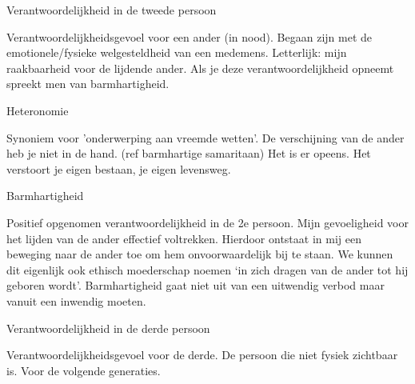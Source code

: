 \documentclass[main.tex]{subfiles}
\begin{document}
\begin{examenvraag}
    \begin{vraag}
        Verantwoordelijkheid in de tweede persoon
    \end{vraag}

    \begin{antwoord}
        Verantwoordelijkheidsgevoel voor een ander (in nood).
        Begaan zijn met de emotionele/fysieke welgesteldheid van een medemens.
        Letterlijk: mijn raakbaarheid voor de lijdende ander.
        Als je deze verantwoordelijkheid opneemt spreekt men van barmhartigheid.

    \end{antwoord}
\end{examenvraag}


\begin{examenvraag}
    \begin{vraag}
        Heteronomie
    \end{vraag}

    \begin{antwoord}
        Synoniem voor 'onderwerping aan vreemde wetten'.
        De verschijning van de ander heb je niet in de hand. (ref barmhartige samaritaan)
        Het is er opeens. 
        Het verstoort je eigen bestaan, je eigen levensweg.
    \end{antwoord}
\end{examenvraag}


\begin{examenvraag}
    \begin{vraag}
        Barmhartigheid
    \end{vraag}

    \begin{antwoord}
	Positief opgenomen verantwoordelijkheid in de‭ ‬2e persoon.‭ ‬Mijn gevoeligheid voor het lijden van 
	de ander effectief voltrekken.‭ ‬Hierdoor ontstaat in mij een beweging naar de ander toe om hem 
	onvoorwaardelijk bij te staan.‭ ‬We kunnen dit eigenlijk ook ethisch moederschap noemen‭ ‬‘in zich 
	dragen van de ander tot hij geboren wordt‭’‬.‭ ‬Barmhartigheid gaat niet uit van een uitwendig 
	verbod maar vanuit een inwendig moeten.
    \end{antwoord}
\end{examenvraag}


\begin{examenvraag}
    \begin{vraag}
        Verantwoordelijkheid in de derde persoon
    \end{vraag}

    \begin{antwoord}
        Verantwoordelijkheidsgevoel voor de derde. 
        De persoon die niet fysiek zichtbaar is.
        Voor de volgende generaties.
    \end{antwoord}
\end{examenvraag}
\end{document}
